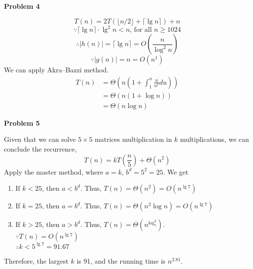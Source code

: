 \documentclass[12pt,letterpaper]{article}
\def\pp{\par\noindent}
\newcommand{\problem}[1]{ \bigskip \pp \textbf{Problem #1}\par}
\begin{document}
\problem{4}
\[T(n)=2T(\lfloor n/2\rfloor+\lceil\lg n\rceil)+n\]
\[\because\lceil\lg n\rceil\cdot\lg^2n < n \text{, for all } n\geq1024\]
\[\therefore|h(n)|=\lceil\lg n\rceil=O(\frac{n}{\log^2n})\]
\[\because |g(n)|=n=O(n^1)\]
We can apply Akra–Bazzi method.
\begin{align*}
	T(n)&=\Theta(n(1+\int_1^n\frac{u}{u^2}du))\\
	&=\Theta(n(1+\log n))\\
	&=\Theta(n\log n)
\end{align*}

\problem{5}
Given that we can solve $5\times5$ matrices multiplication in $k$ multiplications, we can conclude the recurrence,
\[T(n)=kT(\frac{n}{5})+\Theta(n^2)\]
Apply the master method, where $a=k$, $b^d=5^2=25$. We get
\begin{enumerate}
	\item If $k<25$, then $a<b^d$. Thus, $T(n)=\Theta(n^2)=O(n^{\lg7})$
	\item If $k=25$, then $a=b^d$. Thus, $T(n)=\Theta(n^2\log n)=O(n^{\lg7})$
	\item If $k>25$, then $a>b^d$. Thus, $T(n)=\Theta(n^{\log_5^k})$.\\
		$\because T(n)=O(n^{\lg7})$\\
		$\therefore k<5^{\lg7}=91.67$
\end{enumerate}
Therefore, the largest $k$ is 91, and the running time is $n^{2.81}$.
\end{document}

